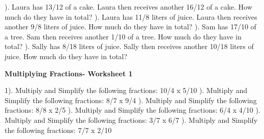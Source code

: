 \documentclass{article}%
\begin{document}
\newline%
). Laura has 13/12 of a cake. Laura then receives another 16/12 of a cake. How much do they have in total?%
\newline%
\newline%
). Laura has 11/8 liters of juice. Laura then receives another 9/8 liters of juice. How much do they have in total?%
\newline%
\newline%
). Sam has 17/10 of a tree. Sam then receives another 1/10 of a tree. How much do they have in total?%
\newline%
\newline%
). Sally has 8/18 liters of juice. Sally then receives another 10/18 liters of juice. How much do they have in total?%
\newline%
\newline%
\newline%
\pagebreak%
\large%
\begin{center}%
\textbf{Multiplying Fractions- Worksheet 1}%
\newline%
\newline%
\newline%
\end{center} \normalsize%
1). Multiply and Simplify the following fractions: 10/4 x 5/10%
\newline%
\newline%
). Multiply and Simplify the following fractions: 8/7 x 9/4%
\newline%
\newline%
). Multiply and Simplify the following fractions: 8/8 x 2/5%
\newline%
\newline%
). Multiply and Simplify the following fractions: 6/4 x 4/10%
\newline%
\newline%
). Multiply and Simplify the following fractions: 3/7 x 6/7%
\newline%
\newline%
). Multiply and Simplify the following fractions: 7/7 x 2/10%
\end{document}
